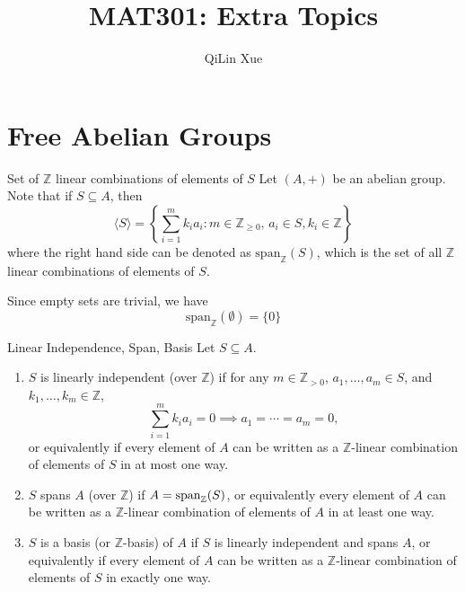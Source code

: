\documentclass{article}
\title{MAT301: Extra Topics}
\author{QiLin Xue}
\begin{document}
\maketitle
\AddToShipoutPictureBG{\AtPageLowerLeft{%
        \color{blue2}\rule{.04\paperwidth}{\paperheight}}}

\tableofcontents
\section{Free Abelian Groups}
\begin{definition}{Set of $\mathbb{Z}$ linear combinations of elements of $S$}
    Let $(A,+)$ be an abelian group. Note that if $S \subseteq A$, then
    \begin{equation*}
        \langle S \rangle = \left\{\sum_{i=1}^{m}k_ia_i:m\in \mathbb{Z}_{\ge 0},\,a_i \in S, k_i \in \mathbb{Z}\right\}
    \end{equation*}
    where the right hand side can be denoted as $\text{span}_{\mathbb{Z}}(S)$, which is the set of all $\mathbb{Z}$ linear combinations of elements of $S$.
\end{definition}
Since empty sets are trivial, we have
\begin{equation}
    \text{span}_{\mathbb{Z}}(\emptyset) = \{0\}
\end{equation}
\begin{definition}{Linear Independence, Span, Basis}
    Let $S \subseteq A$.
    \begin{enumerate}
        \item $S$ is linearly independent (over $\mathbb{Z}$) if for any $m\in \mathbb{Z}_{>0}$, $a_1,\dots,a_m \in S$, and $k_1,\dots,k_m \in \mathbb{Z}$,
              \begin{equation*}
                  \sum_{i=1}^{m} k_ia_i = 0 \implies a_1=\cdots=a_m=0,
              \end{equation*}
              or equivalently if every element of $A$ can be written as a $\mathbb{Z}$-linear combination of elements of $S$ in at most one way.
        \item $S$ spans $A$ (over $\mathbb{Z}$) if $A=\mathrm{span}_{\mathbb{Z}}(S)$, or equivalently every element of $A$ can be written as a $\mathbb{Z}$-linear combination of elements of $A$ in at least one way.
        \item $S$ is a basis (or $\mathbb{Z}$-basis) of $A$ if $S$ is linearly independent and spans $A$, or equivalently if every element of $A$ can be written as a $\mathbb{Z}$-linear combination of elements of $S$ in exactly one way.
    \end{enumerate}
\end{definition}
\end{document}
